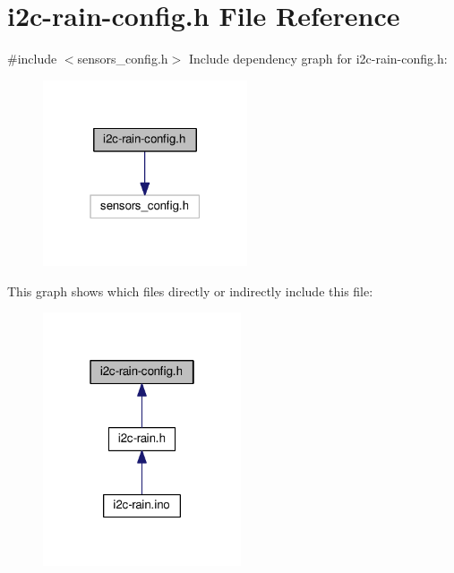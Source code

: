 \hypertarget{i2c-rain-config_8h}{}\section{i2c-\/rain-\/config.h File Reference}
\label{i2c-rain-config_8h}
{\ttfamily \#include $<$sensors\+\_\+config.\+h$>$}\newline
Include dependency graph for i2c-\/rain-\/config.h\+:
\nopagebreak
\begin{figure}[H]
\begin{center}
\leavevmode
\includegraphics[width=171pt]{i2c-rain-config_8h__incl}
\end{center}
\end{figure}
This graph shows which files directly or indirectly include this file\+:
\nopagebreak
\begin{figure}[H]
\begin{center}
\leavevmode
\includegraphics[width=166pt]{i2c-rain-config_8h__dep__incl}
\end{center}
\end{figure}
